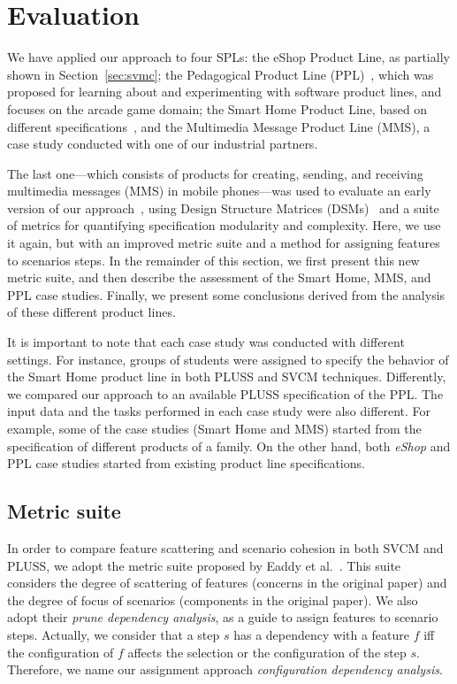 \documentclass{acm_proc_article-sp}
\begin{document}
\section{Evaluation}
\label{sec:evaluation}

We have applied our approach to four SPLs: the eShop Product Line, as partially
shown  in Section~\ref{sec:svmc}; the Pedagogical Product Line
(PPL)~\cite{PPL:2008}, which was proposed for learning about and experimenting
with software product lines, and focuses on the arcade game domain; the Smart
Home Product Line, based on different
specifications~\cite{Pohl:2005aa,Alferez:2008aa}, and the Multimedia Message
Product Line (MMS), a case study conducted with one of our industrial partners.


The last one---which consists of products for creating, sending, and receiving
multimedia messages (MMS) in mobile phones---was used to evaluate an early
version of our approach~\cite{Bonifacio:2008aa}, using Design Structure Matrices
(DSMs)~\cite{Baldwin:2000aa,Lopes:2006aa} and a suite of metrics for quantifying
specification modularity and complexity. Here, we use it again, but with an
improved metric suite and a method for assigning features to scenarios steps. In
the remainder of this section, we first present this new metric suite, and then
describe the assessment of the Smart Home, MMS, and PPL case studies. Finally, we
present some conclusions derived from the analysis of these different product
lines.


It is important to note that each case study was conducted with different
settings. For instance, groups of students were assigned to specify the behavior
of the Smart Home product line in both PLUSS and SVCM techniques. Differently, we
compared our approach to an available PLUSS specification of the PPL. The input
data and the tasks performed in each case study were also different. For example,
some of the case studies (Smart Home and MMS) started from the specification of
different products of a family. On the other hand, both \emph{eShop} and PPL case
studies started from existing product line specifications.


\subsection{Metric suite}\label{sub:metric-suite}

In order to compare feature scattering and scenario cohesion in both SVCM and
PLUSS, we adopt the metric suite proposed by Eaddy et al.~\cite{Eaddy:2007aa}.
This suite considers the degree of scattering of features (concerns in the
original paper) and the degree of focus of scenarios (components in the original
paper). We also adopt their \emph{prune dependency analysis}, as a guide to
assign features to scenario steps. Actually, we consider that a step $s$ has a
dependency with a feature $f$ iff the configuration of $f$ affects the selection
or the configuration of the step $s$. Therefore, we name our assignment approach
\emph{configuration dependency analysis}.
\end{document}
